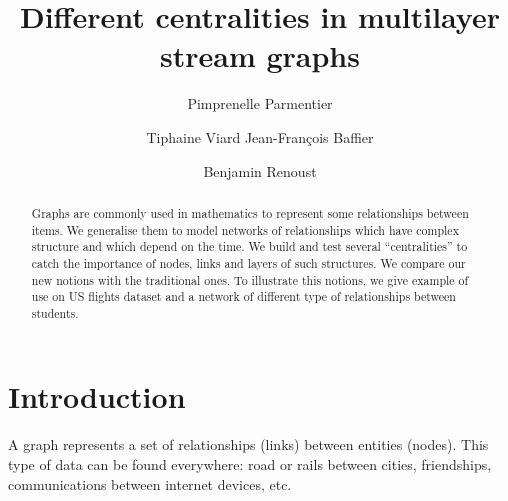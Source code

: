 \documentclass{svproc}
\begin{document}
\mainmatter              %
%
\title{Different centralities in multilayer stream graphs}
%
%
\author{Pimprenelle Parmentier \and Tiphaine Viard
Jean-François Baffier \and Benjamin Renoust}
%
%
%

\maketitle              %

\begin{abstract}
Graphs are commonly used in mathematics to represent some relationships between items. We generalise them to model networks of relationships which have complex structure and which depend on the time. We build and test several ``centralities'' to catch the importance of nodes, links and layers of such structures. We compare our new notions with the traditional ones. To illustrate this notions, we give example of use on US flights dataset and a network of different type of relationships between students.
\end{abstract}
%

\section{Introduction}
%
A graph represents a set of relationships (links) between entities (nodes). This type of data can be found everywhere: road or rails between cities, friendships, communications between internet devices, etc.
\end{document}
